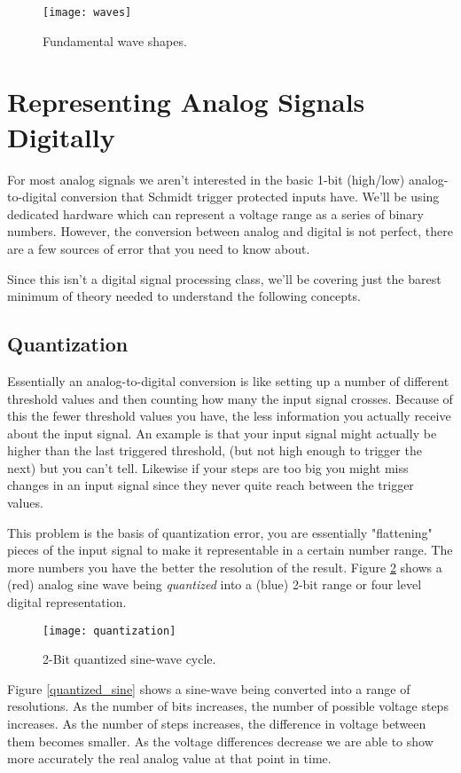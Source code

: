 \documentclass[11pt,fleqn]{book} %
\begin{document}
\begin{figure}[]
    \centering\texttt{[image: waves]}
    \caption{Fundamental wave shapes.}
    \label{waves}
\end{figure}


\section{Representing Analog Signals Digitally}
For most analog signals we aren't interested in the basic 1-bit (high/low) analog-to-digital conversion that Schmidt trigger protected inputs have. We'll be using dedicated hardware which can represent a voltage range as a series of binary numbers. However, the conversion between analog and digital is not perfect, there are a few sources of error that you need to know about. 

Since this isn't a digital signal processing class, we'll be covering just the barest minimum of theory needed to understand the following concepts.

\subsection{Quantization}
Essentially an analog-to-digital conversion is like setting up a number of different threshold values and then counting how many the input signal crosses. Because of this the fewer threshold values you have, the less information you actually receive about the input signal. An example is that your input signal might actually be higher than the last triggered threshold, (but not high enough to trigger the next) but you can't tell. Likewise if your steps are too big you might miss changes in an input signal since they never quite reach between the trigger values.

This problem is the basis of quantization error, you are essentially "flattening" pieces of the input signal to make it representable in a certain number range. The more numbers you have the better the resolution of the result. Figure \ref{quantization} shows a (red) analog sine wave being \textit{quantized} into a (blue) 2-bit range or four level digital representation.  

\begin{figure}[]
    \centering\texttt{[image: quantization]}
    \caption{2-Bit quantized sine-wave cycle.}
    \label{quantization}
\end{figure}

Figure \ref{quantized_sine} shows a sine-wave being converted into a range of resolutions. As the number of bits increases, the number of possible voltage steps increases. As the number of steps increases, the difference in voltage between them becomes smaller. As the voltage differences decrease we are able to show more accurately the real analog value at that point in time.
\end{document}
